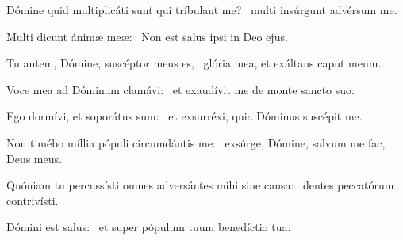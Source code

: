 \item Dómine quid multiplicáti sunt qui tríbulant me?~\psstar{} multi insúrgunt advérsum me.

\item Multi dicunt ánimæ meæ:~\psstar{} Non est salus ipsi in Deo ejus.

\item Tu autem, Dómine, suscéptor meus es,~\psstar{} glória mea, et exáltans caput meum.

\item Voce mea ad Dóminum clamávi:~\psstar{} et exaudívit me de monte sancto suo.

\item Ego dormívi, et soporátus sum:~\psstar{} et exsurréxi, quia Dóminus suscépit me.

\item Non timébo míllia pópuli circumdántis me:~\psstar{} exsúrge, Dómine, salvum me fac, Deus meus.

\item Quóniam tu percussísti omnes adversántes mihi sine causa:~\psstar{} dentes peccatórum contrivísti.

\item Dómini est salus:~\psstar{} et super pópulum tuum benedíctio tua.
